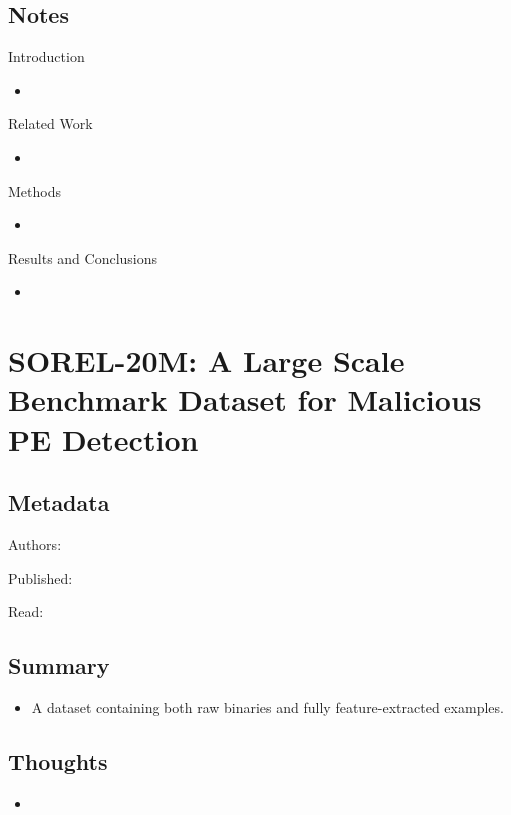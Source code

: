 \documentclass{article}
\begin{document}
\subsection*{Notes}

Introduction
\begin{itemize}
\item
\end{itemize}
Related Work
\begin{itemize}
\item
\end{itemize}
Methods
\begin{itemize}
\item
\end{itemize}
Results and Conclusions
\begin{itemize}
\item
\end{itemize}

\pagebreak


\section*{SOREL-20M: A Large Scale Benchmark Dataset for Malicious PE Detection}

\subsection*{Metadata}

\noindent Authors:

\noindent Published:

\noindent Read:

\subsection*{Summary}
\begin{itemize}
\item A dataset containing both raw binaries and fully feature-extracted examples.
\end{itemize}

\subsection*{Thoughts}
\begin{itemize}
\item
\end{itemize}
\end{document}
